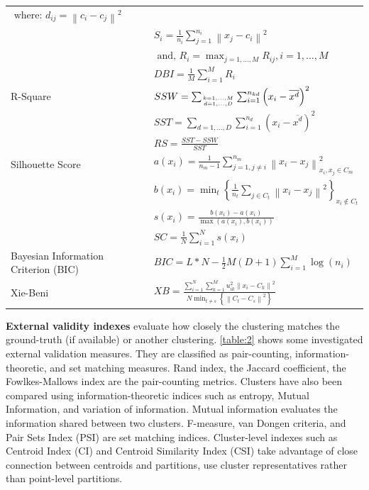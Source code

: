 \documentclass[a4paper, 12pt]{article}
\begin{document}
\begin{tabularx}{\linewidth}{|X|l|}
    $\text { where: } d_{i j}=\left\|c_{i}-c_{j}\right\|^{2}$ \\ &
    $S_{i}=\frac{1}{n_{i}} \sum_{j=1}^{n_{i}}\left\|x_{j}-c_{i}\right\|^{2}$ \\ &
    $\text { and, } R_{i}=\max _{j=1, \ldots, M} R_{i j}, i=1, \ldots, M$ \\ &
    $D B I=\frac{1}{M} \sum_{i=1}^{M} R_{i}$ \\
    \hline R-Square & $S S W=\sum_{k=1, \ldots, M \atop d=1, \ldots, D} \sum_{i=1}^{n_{k d}}\left(x_{i}-\overline{x^{d}}\right)^{2}$ \\ &
    $S S T=\sum_{d=1, \ldots, D} \sum_{i=1}^{n_{d}}\left(x_{i}-\overline{x^{d}}\right)^{2}$ \\ &
    $R S=\frac{S S T-S S W}{S S T}$ \\
    \hline Silhouette Score \citep{zoubi2008efficient} & $a\left(x_{i}\right)=\frac{1}{n_{m}-1} \sum_{j=1, j \neq i}^{n_{m}}\left\|x_{i}-x_{j}\right\|_{x_{i}, x_{j} \in C_{m}}^{2}$ \\ &
    $b\left(x_{i}\right)=\min _{t}\left\{\frac{1}{n_{t}} \sum_{j \in C_{t}}\left\|x_{i}-x_{j}\right\|^{2}\right\}_{x_{i} \notin C_{t}}$ \\ &
    $s\left(x_{i}\right)=\frac{b\left(x_{i}\right)-a\left(x_{i}\right)}{\max \left(a\left(x_{i}\right), b\left(x_{i}\right)\right)}$ \\ &
    $S C=\frac{1}{N} \sum_{i=1}^{N} s\left(x_{i}\right)$ \\
    \hline Bayesian Information Criterion (BIC) \citep{zhao2008knee} & $B I C=L * N-\frac{1}{2} M(D+1) \sum_{i=1}^{M} \log \left(n_{i}\right)$ \\
    \hline Xie-Beni \citep{xie1991validity} & $X B=\frac{\sum_{i=1}^{N} \sum_{k=1}^{M} u_{i k}^{2}\left\|x_{i}-C_{k}\right\|^{2}}{N \min _{t \neq s}\left\{\left\|C_{t}-C_{s}\right\|^{2}\right\}}$ 
    \label{table:1}
\end{tabularx}

\textbf{External validity indexes} evaluate how closely the clustering matches the ground-truth (if available) or another clustering. \autoref{table:2} shows some investigated external validation measures. They are classified as pair-counting, information-theoretic, and set matching measures. Rand index, the Jaccard coefficient, the Fowlkes-Mallows index are the pair-counting metrics. Clusters have also been compared using information-theoretic indices such as entropy, Mutual Information, and variation of information. Mutual information evaluates the information shared between two clusters. F-measure, van Dongen criteria, and Pair Sets Index (PSI) \citep{rezaei2016set} are set matching indices. Cluster-level indexes such as Centroid Index (CI) and Centroid Similarity Index (CSI) \citep{franti2014centroid} take advantage of close connection between centroids and partitions, use cluster representatives rather than point-level partitions.
\end{document}
